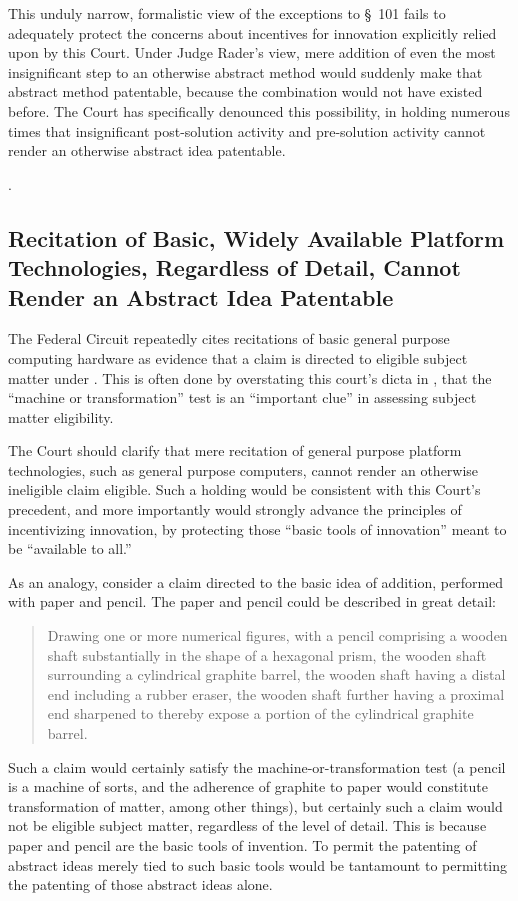 \documentclass{scotus}
\begin{document}
This unduly narrow, formalistic view of the exceptions to \S~101 fails to
adequately protect the concerns about incentives for innovation explicitly
relied upon by this Court. Under Judge Rader's view, mere addition of even the
most insignificant step to an otherwise abstract method would suddenly make that
abstract method patentable, because the combination would not have existed
before. The Court has specifically denounced this possibility, in holding
numerous times that insignificant post-solution activity and pre-solution
activity cannot render an otherwise abstract idea patentable.

.

\subsection{Recitation of Basic, Widely Available Platform Technologies,
Regardless of Detail, Cannot Render an Abstract Idea Patentable}

The Federal Circuit repeatedly cites recitations of basic general purpose
computing hardware as evidence that a claim is directed to eligible
subject matter under . This is often done by overstating this
court's dicta in , that the ``machine or transformation'' test is
an ``important clue'' in assessing subject matter eligibility.

The Court should clarify that mere recitation of general purpose platform
technologies, such as general purpose computers, cannot render an otherwise
ineligible claim eligible. Such a holding would be consistent with this Court's
precedent, and more importantly would strongly advance the principles of
incentivizing innovation, by protecting those ``basic tools of innovation''
meant to be ``available to all.''

As an analogy, consider a claim directed to the basic idea of addition,
performed with paper and pencil. The paper and pencil could be described in
great detail:
\begin{quote}
Drawing one or more numerical figures, with a pencil comprising a wooden shaft
substantially in the shape of a hexagonal prism, the wooden shaft surrounding a
cylindrical graphite barrel, the wooden shaft having a distal end including a
rubber eraser, the wooden shaft further having a proximal end sharpened to
thereby expose a portion of the cylindrical graphite barrel.
\end{quote}
Such a claim would certainly satisfy the machine-or-transformation test (a
pencil is a machine of sorts, and the adherence of graphite to paper would
constitute transformation of matter, among other things), but certainly such a
claim would not be eligible subject matter, regardless of the level of detail.
This is because paper and pencil are the basic tools of invention. To permit the
patenting of abstract ideas merely tied to such basic tools would be tantamount
to permitting the patenting of those abstract ideas alone.
\end{document}

